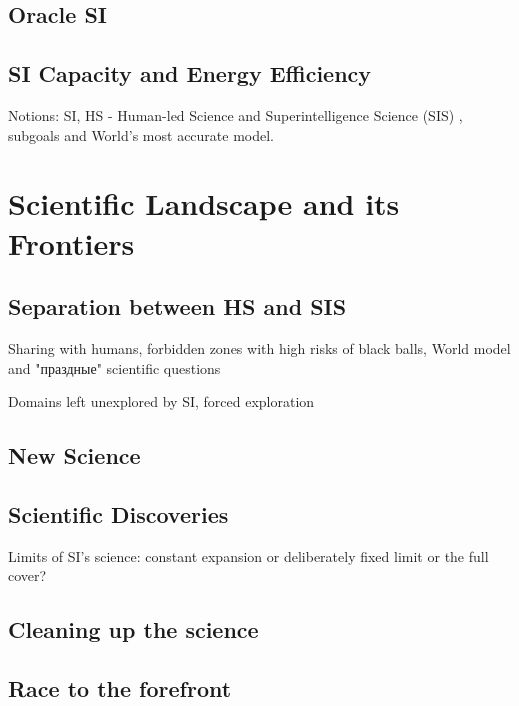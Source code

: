 \documentclass[a4paper,11pt]{article}
\begin{document}
        \subsection{Oracle SI}

        \subsection{SI Capacity and Energy Efficiency}

        Notions: SI, HS - Human-led Science  and Superintelligence Science (SIS) , subgoals and World's most accurate model.

    \section{Scientific Landscape and its Frontiers}

        \subsection{Separation between HS and SIS}

        Sharing with humans, forbidden zones with high risks of black balls, World model and "праздные" scientific questions

        Domains left unexplored by SI, forced exploration

        \subsection{New Science}

        \subsection{Scientific Discoveries}

        Limits of SI's science: constant expansion or deliberately fixed limit or the full cover?

        \subsection{Cleaning up the science}

        \subsection{Race to the forefront}
\end{document}

